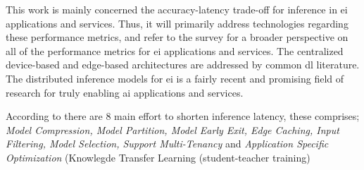   


This work is mainly concerned the accuracy-latency trade-off for inference in \gls{ei} applications and services. Thus, it will primarily address technologies regarding these performance metrics, and refer to the survey for a broader perspective on all of the performance metrics for \gls{ei} applications and services. The centralized device-based and edge-based architectures are addressed by common \gls{dl} literature. The distributed inference models for \gls{ei} is a fairly recent and promising field of research for truly enabling \gls{ai} applications and services.

According to \cite{zhou_edge_2019} there are 8 main effort to shorten inference latency, these comprises; \textit{Model Compression, Model Partition, Model Early Exit, Edge Caching, Input Filtering, Model Selection, Support Multi-Tenancy} and \textit{Application Specific Optimization} (Knowlegde Transfer Learning (student-teacher training)




